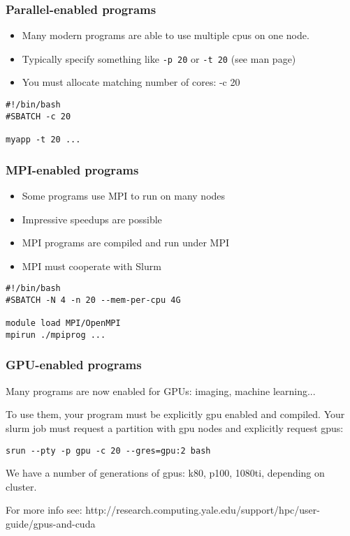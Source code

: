 \documentclass[10pt]{beamer}
\begin{document}
\begin{frame}[fragile]
\frametitle{Parallel-enabled programs}
\begin{itemize}
\item Many modern programs are able to use multiple cpus on one node.
\item Typically specify something like \verb+-p 20+ or \verb+-t 20+ (see man page)
\item You must allocate matching number of cores: -c 20
\end{itemize}

\begin{block}{}
\begin{verbatim}
#!/bin/bash
#SBATCH -c 20

myapp -t 20 ...
\end{verbatim}
\end{block}{}
\end{frame}

\begin{frame}[fragile]
\frametitle{MPI-enabled programs}
\begin{itemize}
\item Some programs use MPI to run on many nodes
\item Impressive speedups are possible
\item MPI programs are compiled and run under MPI
\item MPI must cooperate with Slurm
\end{itemize}

\begin{block}{}
\begin{verbatim}
#!/bin/bash
#SBATCH -N 4 -n 20 --mem-per-cpu 4G

module load MPI/OpenMPI
mpirun ./mpiprog ...
\end{verbatim}
\end{block}{}
\end{frame}

\begin{frame}[fragile]
\frametitle{GPU-enabled programs}
Many programs are now enabled for GPUs: imaging, machine learning...

To use them, your program must be explicitly gpu enabled and compiled.
Your slurm job must request a partition with gpu nodes and explicitly request gpus:

\begin{verbatim}
srun --pty -p gpu -c 20 --gres=gpu:2 bash
\end{verbatim}


We have a number of generations of gpus: k80, p100, 1080ti, depending on cluster.

For more info see:
http://research.computing.yale.edu/support/hpc/user-guide/gpus-and-cuda

\end{frame}
\end{document}
